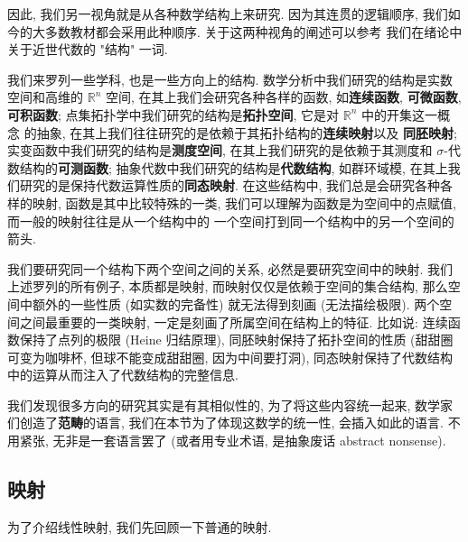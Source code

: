 \documentclass[UTF8]{book}
\begin{document}
因此, 我们另一视角就是从各种数学结构上来研究. 因为其连贯的逻辑顺序, 
我们如今的大多数教材都会采用此种顺序. 关于这两种视角的阐述可以参考
我们在绪论中关于近世代数的 "结构" 一词. 

我们来罗列一些学科, 也是一些方向上的结构. 
数学分析中我们研究的结构是实数空间和高维的 $\mathbb{R}^n$ 空间, 
在其上我们会研究各种各样的函数, 如\textbf{连续函数}, \textbf{可微函数}, 
\textbf{可积函数}; 
点集拓扑学中我们研究的结构是\textbf{拓扑空间}, 它是对 $\mathbb{R}^n$ 中的开集这一概念
的抽象, 在其上我们往往研究的是依赖于其拓扑结构的\textbf{连续映射}以及
\textbf{同胚映射}; 
实变函数中我们研究的结构是\textbf{测度空间}, 
在其上我们研究的是依赖于其测度和 $\sigma$-代数结构的\textbf{可测函数}; 
抽象代数中我们研究的结构是\textbf{代数结构}, 如群环域模, 
在其上我们研究的是保持代数运算性质的\textbf{同态映射}. 
在这些结构中, 我们总是会研究各种各样的映射, 函数是其中比较特殊的一类, 
我们可以理解为函数是为空间中的点赋值, 而一般的映射往往是从一个结构中的
一个空间打到同一个结构中的另一个空间的箭头. 

我们要研究同一个结构下两个空间之间的关系, 必然是要研究空间中的映射. 
我们上述罗列的所有例子, 本质都是映射, 而映射仅仅是依赖于空间的集合结构, 
那么空间中额外的一些性质 (如实数的完备性) 就无法得到刻画 (无法描绘极限). 
两个空间之间最重要的一类映射, 一定是刻画了所属空间在结构上的特征. 
比如说: 连续函数保持了点列的极限 (Heine 归结原理), 
同胚映射保持了拓扑空间的性质 (甜甜圈可变为咖啡杯, 但球不能变成甜甜圈, 
因为中间要打洞), 
同态映射保持了代数结构中的运算从而注入了代数结构的完整信息. 

我们发现很多方向的研究其实是有其相似性的, 为了将这些内容统一起来, 
数学家们创造了\textbf{范畴}的语言, 我们在本节为了体现这数学的统一性, 
会插入如此的语言. 不用紧张, 无非是一套语言罢了 (或者用专业术语, 
是抽象废话 abstract nonsense). 

\subsection{映射}

为了介绍线性映射, 我们先回顾一下普通的映射.
\end{document}
